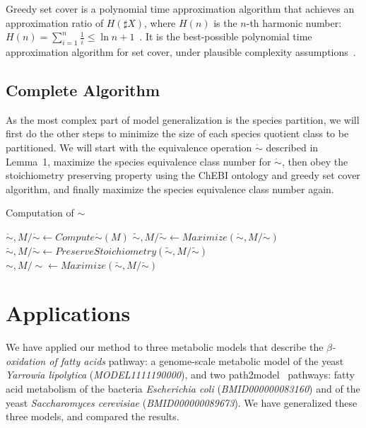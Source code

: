 \documentclass[10pt]{bmc_article}
\newenvironment{bmcformat}{\baselineskip20pt\sloppy\setboolean{publ}{false}}{\baselineskip20pt\sloppy}
\begin{document}
\begin{bmcformat}
Greedy set cover is a polynomial time approximation algorithm that achieves an approximation ratio of $H(\sharp X)$, where $H(n)$ is the $n$-th harmonic number: $H(n) = \sum^n_{i = 1}\frac{1}{i} \leq \ln{n} + 1$~\cite{Chvatal1979}. It is the best-possible polynomial time approximation algorithm for set cover, under plausible complexity assumptions~\cite{Feige1998}. 

\subsection*{Complete Algorithm}
As the most complex part of model generalization is the species partition, we will first do the other steps to minimize the size of each species quotient class to be partitioned. We will start with the equivalence operation $\mathring{\sim}$ described in Lemma~1, maximize the species equivalence class number for $\mathring{\sim}$, then obey the stoichiometry preserving property using the ChEBI ontology and greedy set cover algorithm, and finally maximize the species equivalence class number again.\\

\begin{algorithm}[H]
\SetAlgoVlined
{}
\caption{Computation of ${\sim}$}
\BlankLine
\BlankLine
$\mathring{\sim}, M/\mathring{\sim} \leftarrow Compute\mathring{\sim}(M)$ \;
$\tilde{\sim}, M/\tilde{\sim} \leftarrow Maximize(\mathring{\sim}, M/{\mathring{\sim}})$ \;
$\breve{\sim}, M/\breve{\sim} \leftarrow PreserveStoichiometry(\tilde{\sim}, M/\tilde{\sim})$ \;
$\sim, M/\sim \leftarrow Maximize(\breve{\sim}, M/\breve{\sim})$ \;
\BlankLine
{}
\end{algorithm} 

\section*{Applications}
We have applied our method to three metabolic models that describe the \textit{$\beta$-oxidation of fatty acids} pathway: a genome-scale metabolic model of the yeast \textit{Yarrowia lipolytica} (\emph{MODEL1111190000}), and two path2model~\cite{Li10} pathways: fatty acid metabolism of the bacteria \textit{Escherichia coli} (\emph{BMID000000083160}) and of the yeast \textit{Saccharomyces cerevisiae} (\emph{BMID000000089673}). We have generalized these three models, and compared the results. 


\end{bmcformat}
\end{document}

